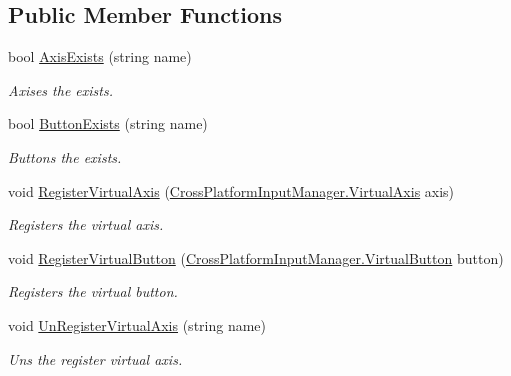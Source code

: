 \subsection*{Public Member Functions}
\begin{DoxyCompactItemize}
\item 
bool \hyperlink{class_lerp2_assets_1_1_cross_platform_input_1_1_cross_platform_input_1_1_virtual_input_ae58ab0f5614c8834623dc0c047a56ea3}{Axis\+Exists} (string name)
\begin{DoxyCompactList}\small\item\em Axises the exists. \end{DoxyCompactList}\item 
bool \hyperlink{class_lerp2_assets_1_1_cross_platform_input_1_1_cross_platform_input_1_1_virtual_input_a72858fcf919526f4a54fd2469f25b4d8}{Button\+Exists} (string name)
\begin{DoxyCompactList}\small\item\em Buttons the exists. \end{DoxyCompactList}\item 
void \hyperlink{class_lerp2_assets_1_1_cross_platform_input_1_1_cross_platform_input_1_1_virtual_input_a8a142c46ce309abf02de47420161e0ba}{Register\+Virtual\+Axis} (\hyperlink{class_lerp2_assets_1_1_cross_platform_input_1_1_cross_platform_input_manager_1_1_virtual_axis}{Cross\+Platform\+Input\+Manager.\+Virtual\+Axis} axis)
\begin{DoxyCompactList}\small\item\em Registers the virtual axis. \end{DoxyCompactList}\item 
void \hyperlink{class_lerp2_assets_1_1_cross_platform_input_1_1_cross_platform_input_1_1_virtual_input_afc80fdd71038719b9858d02f6e16df5d}{Register\+Virtual\+Button} (\hyperlink{class_lerp2_assets_1_1_cross_platform_input_1_1_cross_platform_input_manager_1_1_virtual_button}{Cross\+Platform\+Input\+Manager.\+Virtual\+Button} button)
\begin{DoxyCompactList}\small\item\em Registers the virtual button. \end{DoxyCompactList}\item 
void \hyperlink{class_lerp2_assets_1_1_cross_platform_input_1_1_cross_platform_input_1_1_virtual_input_af0f13e890e55d9294222ccce07fedab4}{Un\+Register\+Virtual\+Axis} (string name)
\begin{DoxyCompactList}\small\item\em Uns the register virtual axis. \end{DoxyCompactList}\item 

\end{DoxyCompactItemize}

